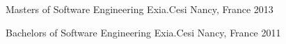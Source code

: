 

\begin{cventries}

  \educationentry
    {Masters of Software Engineering} %
    {Exia.Cesi} %
    {Nancy, France} %
    {2013} %
    
  \educationentry
    {Bachelors of Software Engineering} %
    {Exia.Cesi} %
    {Nancy, France} %
    {2011} %

\end{cventries}
